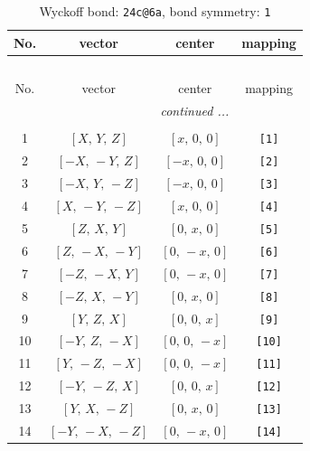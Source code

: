 \documentclass[fleqn,8pt]{jsarticle}
\begin{document}
\begin{longtable}{cccc}
\caption{Wyckoff bond: {\tt 24c@6a}, bond symmetry: {\tt 1}}
 \\
 \hline \hline
No. & vector & center & mapping \\ \hline \endfirsthead

\multicolumn{3}{l}{\tablename\ \thetable{}} \\
 \hline \hline
No. & vector & center & mapping \\ \hline \endhead

 \hline \hline
\multicolumn{3}{r}{\footnotesize\it continued ...} \\ \endfoot

 \hline \hline
\multicolumn{3}{r}{} \\ \endlastfoot

1 & $\left[ X,\, Y,\, Z \right]$ & $\left[ x,\, 0,\, 0 \right]$ & {\tt [1]} \\ \hline
2 & $\left[ - X,\, - Y,\, Z \right]$ & $\left[ - x,\, 0,\, 0 \right]$ & {\tt [2]} \\ \hline
3 & $\left[ - X,\, Y,\, - Z \right]$ & $\left[ - x,\, 0,\, 0 \right]$ & {\tt [3]} \\ \hline
4 & $\left[ X,\, - Y,\, - Z \right]$ & $\left[ x,\, 0,\, 0 \right]$ & {\tt [4]} \\ \hline
5 & $\left[ Z,\, X,\, Y \right]$ & $\left[ 0,\, x,\, 0 \right]$ & {\tt [5]} \\ \hline
6 & $\left[ Z,\, - X,\, - Y \right]$ & $\left[ 0,\, - x,\, 0 \right]$ & {\tt [6]} \\ \hline
7 & $\left[ - Z,\, - X,\, Y \right]$ & $\left[ 0,\, - x,\, 0 \right]$ & {\tt [7]} \\ \hline
8 & $\left[ - Z,\, X,\, - Y \right]$ & $\left[ 0,\, x,\, 0 \right]$ & {\tt [8]} \\ \hline
9 & $\left[ Y,\, Z,\, X \right]$ & $\left[ 0,\, 0,\, x \right]$ & {\tt [9]} \\ \hline
10 & $\left[ - Y,\, Z,\, - X \right]$ & $\left[ 0,\, 0,\, - x \right]$ & {\tt [10]} \\ \hline
11 & $\left[ Y,\, - Z,\, - X \right]$ & $\left[ 0,\, 0,\, - x \right]$ & {\tt [11]} \\ \hline
12 & $\left[ - Y,\, - Z,\, X \right]$ & $\left[ 0,\, 0,\, x \right]$ & {\tt [12]} \\ \hline
13 & $\left[ Y,\, X,\, - Z \right]$ & $\left[ 0,\, x,\, 0 \right]$ & {\tt [13]} \\ \hline
14 & $\left[ - Y,\, - X,\, - Z \right]$ & $\left[ 0,\, - x,\, 0 \right]$ & {\tt [14]} \\ \hline

\end{longtable}
\end{document}
